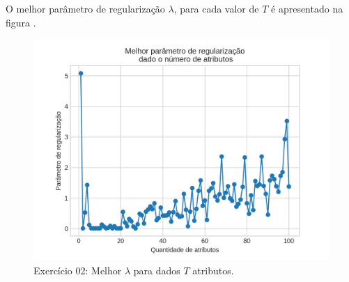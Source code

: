\documentclass{article}
\begin{document}
    O melhor parâmetro de regularização $\lambda$, para cada valor de $T$ é apresentado na figura .
    \begin{figure}[H]
        \centering
        \includegraphics[width=\linewidth]{ex02/Tslambs.png}
        \caption{Exercício 02: Melhor $\lambda$ para dados $T$ atributos.}
        \label{fig:ex2_Tlamb}
    \end{figure}
 
\end{document}
